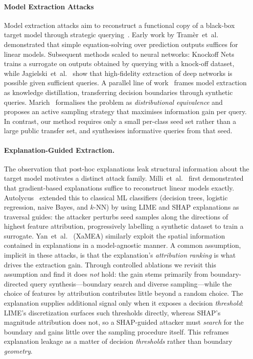 \documentclass[sigconf,anonymous,review]{acmart}
\begin{document}
\paragraph{Model Extraction Attacks}
Model extraction attacks aim to reconstruct a functional copy of a black-box target model through strategic querying~\cite{tramer2016stealing}.
Early work by Tram\`er~et~al.~\cite{tramer2016stealing} demonstrated that
simple equation-solving over prediction outputs suffices for linear models.
Subsequent methods scaled to neural networks: Knockoff Nets~\cite{orekondy2019knockoff}
trains a surrogate on outputs obtained by querying with a knock-off dataset,
while Jagielski~et~al.~\cite{jagielski2020high} show that high-fidelity extraction
of deep networks is possible given sufficient queries.
A parallel line of work~\cite{papernot2017practical,correia2018copycat} frames
model extraction as knowledge distillation, transferring decision boundaries
through synthetic queries.
Marich~\cite{karmakar2023marich} formalises the problem as \emph{distributional equivalence}
and proposes an active sampling strategy that maximises information gain per query.
In contrast, our method requires only a small per-class seed set rather than a large
public transfer set, and synthesises informative queries from that seed.

\paragraph{Explanation-Guided Extraction.}
The observation that post-hoc explanations leak structural information about the
target model motivates a distinct attack family.
Milli~et~al.~\cite{milli2019model} first demonstrated that gradient-based explanations
suffice to reconstruct linear models exactly.
Autolycus~\cite{oksuz2024autolycus} extended this to classical ML classifiers
(decision trees, logistic regression, naive Bayes, and $k$-NN) by using LIME and SHAP
explanations as traversal guides: the attacker perturbs seed samples along the
directions of highest feature attribution, progressively labelling a synthetic dataset
to train a surrogate. Yan~et~al.~\cite{yan2023explanationleaks} (XaMEA) similarly
exploit the spatial information contained in explanations in a model-agnostic manner.
A common assumption, implicit in these attacks, is that the explanation's
\emph{attribution ranking} is what drives the extraction gain.
Through controlled ablations we revisit this assumption and find it does \emph{not}
hold: the gain stems primarily from boundary-directed query synthesis---boundary
search and diverse sampling---while the choice of features by attribution
contributes little beyond a random choice. The explanation supplies additional signal
only when it exposes a decision \emph{threshold}: LIME's discretization surfaces such
thresholds directly, whereas SHAP's magnitude attribution does not, so a SHAP-guided
attacker must \emph{search} for the boundary and gains little over the sampling
procedure itself. This reframes explanation leakage as a matter of decision
\emph{thresholds} rather than boundary \emph{geometry}.
\end{document}
